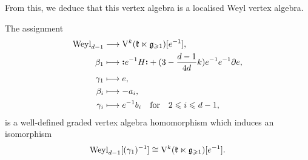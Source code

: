From this, we deduce that this vertex algebra is a localised Weyl vertex algebra.

\begin{theorem} \label{theorem:commutant-localisation-weyl}
	The assignment 
	\[ \begin{aligned}
		\mathrm{Weyl}_{d-1} & \longrightarrow  \mathrm V^k(\mathfrak k \ltimes \mathfrak g_{\geqslant 1})[e^{-1}], \\
		\beta_1 & \longmapsto  \mathopen{\boldsymbol{\vcentcolon}}e^{-1} H\mathclose{\boldsymbol{\vcentcolon}} + (3 - \frac{d - 1}{4 d} k) e^{-1} e^{-1} \partial e, \\
		\gamma_1 & \longmapsto e, \\
		\beta_i & \longmapsto - a_i, \\
		\gamma_i & \longmapsto e^{-1} b_i \quad \text{for} \quad 2 \leqslant i \leqslant d - 1,
	\end{aligned}  \]
	is a well-defined graded vertex algebra homomorphism which induces an isomorphism
	\[ \mathrm{Weyl}_{d-1}[(\gamma_1)^{-1}] \cong \mathrm V^k(\mathfrak k \ltimes \mathfrak g_{\geqslant 1})[e^{-1}]. \]
\end{theorem}

